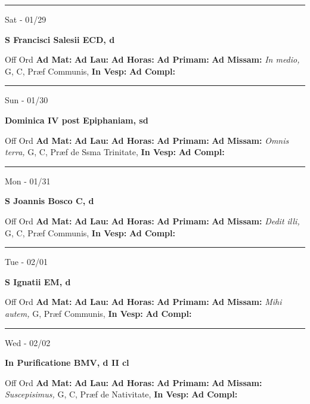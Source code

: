 \documentclass[letterpaper, 10pt]{article}
\begin{document}
\hrule
\begin{center}
Sat - 01/29
\end{center}\textbf{ \large S Francisci Salesii ECD, \textnormal{\normalsize d}}
\begin{justify}
Off Ord
\textbf{Ad Mat: }
\textbf{Ad Lau: }
\textbf{Ad Horas: }
\textbf{Ad Primam: }
\textbf{Ad Missam:} \textit{In medio, } G, C, Præf Communis, 
\textbf{In Vesp: }
\textbf{Ad Compl: }\end{justify}



\hrule
\begin{center}
Sun - 01/30
\end{center}\textbf{ \large Dominica IV post Epiphaniam, \textnormal{\normalsize sd}}
\begin{justify}
Off Ord
\textbf{Ad Mat: }
\textbf{Ad Lau: }
\textbf{Ad Horas: }
\textbf{Ad Primam: }
\textbf{Ad Missam:} \textit{Omnis terra, } G, C, Præf de Ssma Trinitate, 
\textbf{In Vesp: }
\textbf{Ad Compl: }\end{justify}



\hrule
\begin{center}
Mon - 01/31
\end{center}\textbf{ \large S Joannis Bosco C, \textnormal{\normalsize d}}
\begin{justify}
Off Ord
\textbf{Ad Mat: }
\textbf{Ad Lau: }
\textbf{Ad Horas: }
\textbf{Ad Primam: }
\textbf{Ad Missam:} \textit{Dedit illi, } G, C, Præf Communis, 
\textbf{In Vesp: }
\textbf{Ad Compl: }\end{justify}



\hrule
\begin{center}
Tue - 02/01
\end{center}\textbf{ \large S Ignatii EM, \textnormal{\normalsize d}}
\begin{justify}
Off Ord
\textbf{Ad Mat: }
\textbf{Ad Lau: }
\textbf{Ad Horas: }
\textbf{Ad Primam: }
\textbf{Ad Missam:} \textit{Mihi autem, } G, Præf Communis, 
\textbf{In Vesp: }
\textbf{Ad Compl: }\end{justify}



\hrule
\begin{center}
Wed - 02/02
\end{center}\textbf{ \large In Purificatione BMV, \textnormal{\normalsize d II cl}}
\begin{justify}
Off Ord
\textbf{Ad Mat: }
\textbf{Ad Lau: }
\textbf{Ad Horas: }
\textbf{Ad Primam: }
\textbf{Ad Missam:} \textit{Suscepisimus, } G, C, Præf de Nativitate, 
\textbf{In Vesp: }
\textbf{Ad Compl: }\end{justify}
\end{document}
